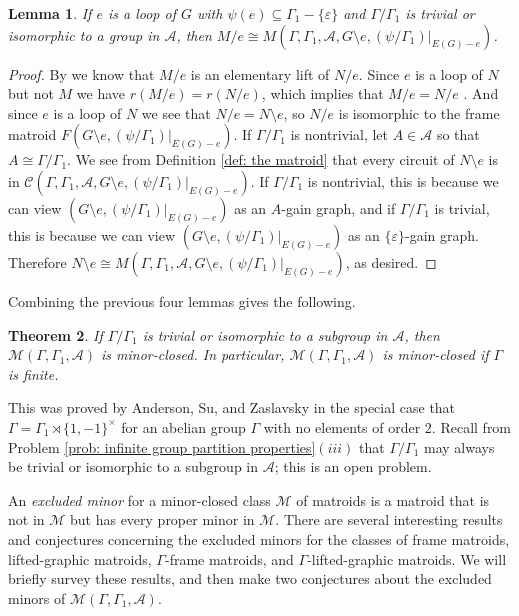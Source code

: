 \documentclass[12pt]{article}
\newtheorem{theorem}{Theorem}[section]
\newtheorem{lemma}[theorem]{Lemma}
\theoremstyle{definition}
\newcommand{\cA}{\mathcal{A}}
\newcommand{\cC}{\mathcal{C}}
\newcommand{\cM}{\mathcal{M}}
\newcommand{\ep}{\varepsilon}
\newcommand{\del}{\!\setminus\!}
\begin{document}
\begin{lemma} \label{lem: loop contraction easy case}
If $e$ is a loop of $G$ with $\psi(e) \subseteq \Gamma_1 - \{\ep\}$ and $\Gamma/\Gamma_1$ is trivial or isomorphic to a group in $\cA$, then $M/e \cong M(\Gamma, \Gamma_1, \cA, G \del e, (\psi/\Gamma_1)|_{E(G) - e})$.
\end{lemma}
\begin{proof}
By \cite[pg. 282, Exercise 11]{Oxley2011} we know that $M/e$ is an elementary lift of $N/e$.
Since $e$ is a loop of $N$ but not $M$ we have $r(M/e) = r(N/e)$, which implies that $M/e = N/e$ \cite[Corollary 7.3.4]{Oxley2011}.
And since $e$ is a loop of $N$ we see that $N/e = N\del e$, so $N/e$ is isomorphic to the frame matroid $F(G \del e, (\psi/\Gamma_1)|_{E(G) - e})$.
If $\Gamma/\Gamma_1$ is nontrivial, let $A \in \cA$ so that $A \cong \Gamma/\Gamma_1$.
We see from Definition \ref{def: the matroid} that every circuit of $N \del e$ is in $\cC(\Gamma, \Gamma_1, \cA, G \del e, (\psi/\Gamma_1)|_{E(G) - e})$.
If $\Gamma/\Gamma_1$ is nontrivial, this is because we can view $(G \del e, (\psi/\Gamma_1)|_{E(G) - e})$ as an $A$-gain graph, and if $\Gamma/\Gamma_1$ is trivial, this is because we can view $(G \del e, (\psi/\Gamma_1)|_{E(G) - e})$ as an $\{\ep\}$-gain graph.
Therefore $N \del e \cong M(\Gamma, \Gamma_1, \cA, G \del e, (\psi/\Gamma_1)|_{E(G) - e})$, as desired.
\end{proof}




Combining the previous four lemmas gives the following.


\begin{theorem} \label{thm: minor-closed}
If $\Gamma/\Gamma_1$ is trivial or isomorphic to a subgroup in $\cA$, then $\cM(\Gamma, \Gamma_1, \cA)$ is minor-closed.
In particular, $\cM(\Gamma, \Gamma_1, \cA)$ is minor-closed if $\Gamma$ is finite.
\end{theorem}


This was proved by Anderson, Su, and Zaslavsky \cite[Theorem 9.6]{Anderson-Su-Zaslavsky2024} in the special case that $\Gamma = \Gamma_1 \rtimes \{1, -1\}^{\times}$ for an abelian group $\Gamma$ with no elements of order $2$.
Recall from Problem \ref{prob: infinite group partition properties}$(iii)$ that $\Gamma/\Gamma_1$ may always be trivial or isomorphic to a subgroup in $\cA$; this is an open problem.


An \emph{excluded minor} for a minor-closed class $\cM$ of matroids is a matroid that is not in $\cM$ but has every proper minor in $\cM$.
There are several interesting results and conjectures concerning the excluded minors for the classes of frame matroids, lifted-graphic matroids, $\Gamma$-frame matroids, and $\Gamma$-lifted-graphic matroids.
We will briefly survey these results, and then make two conjectures about the excluded minors of $\cM(\Gamma, \Gamma_1, \cA)$.
\end{document}
